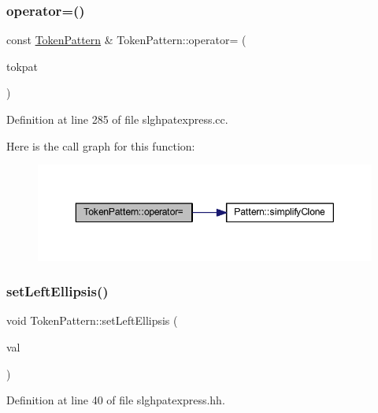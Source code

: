 \subsubsection{\texorpdfstring{operator=()}{operator=()}}
{\footnotesize\ttfamily const \mbox{\hyperlink{class_token_pattern}{Token\+Pattern}} \& Token\+Pattern\+::operator= (\begin{DoxyParamCaption}\item[{const \mbox{\hyperlink{class_token_pattern}{Token\+Pattern}} \&}]{tokpat }\end{DoxyParamCaption})}



Definition at line 285 of file slghpatexpress.\+cc.

Here is the call graph for this function\+:
\nopagebreak
\begin{figure}[H]
\begin{center}
\leavevmode
\includegraphics[width=350pt]{class_token_pattern_ae92469c4426988e363f1e8dd1f14a6e6_cgraph}
\end{center}
\end{figure}
\mbox{\label{class_token_pattern_a04ac201bbf0e434339f22808273a02f9}} 
\subsubsection{\texorpdfstring{setLeftEllipsis()}{setLeftEllipsis()}}
{\footnotesize\ttfamily void Token\+Pattern\+::set\+Left\+Ellipsis (\begin{DoxyParamCaption}\item[{bool}]{val }\end{DoxyParamCaption})\hspace{0.3cm}{\ttfamily [inline]}}



Definition at line 40 of file slghpatexpress.\+hh.

